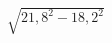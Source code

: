 \begin{ex}[type=calculate]
	\begin{condition}
		\( \sqrt{21,8^2-18,2^2} \)
	\end{condition}
\end{ex}